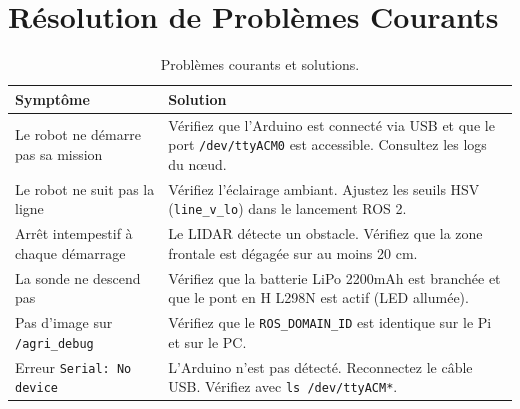 \documentclass [12pt, a4paper]{article}
\begin{document}
\section{Résolution de Problèmes Courants}

\begin{table}[H]
\centering
\begin{tabularx}{\textwidth}{lX}
\toprule
\textbf{Symptôme} & \textbf{Solution} \\
\midrule
Le robot ne démarre pas sa mission & Vérifiez que l'Arduino est connecté via USB et que le port \texttt{/dev/ttyACM0} est accessible. Consultez les logs du nœud. \\
\addlinespace
Le robot ne suit pas la ligne & Vérifiez l'éclairage ambiant. Ajustez les seuils HSV (\texttt{line\_v\_lo}) dans le lancement ROS 2. \\
\addlinespace
Arrêt intempestif à chaque démarrage & Le LIDAR détecte un obstacle. Vérifiez que la zone frontale est dégagée sur au moins 20 cm. \\
\addlinespace
La sonde ne descend pas & Vérifiez que la batterie LiPo 2200mAh est branchée et que le pont en H L298N est actif (LED allumée). \\
\addlinespace
Pas d'image sur \texttt{/agri\_debug} & Vérifiez que le \texttt{ROS\_DOMAIN\_ID} est identique sur le Pi et sur le PC. \\
\addlinespace
Erreur \texttt{Serial: No device} & L'Arduino n'est pas détecté. Reconnectez le câble USB. Vérifiez avec \texttt{ls /dev/ttyACM*}. \\
\bottomrule
\end{tabularx}
\caption{Problèmes courants et solutions.}
\end{table}
\end{document}

